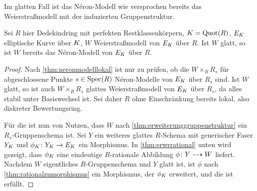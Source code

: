 Im glatten Fall ist das Néron-Modell wie versprochen bereits das
Weierstraßmodell mit der induzierten Gruppenstruktur.
\begin{Satz}\label{thm:neronmausweierstrassgl}
  Sei $R$ hier Dedekindring mit perfekten Restklassenkörpern,
  ${K=\operatorname{Quot}(R)}$,
  $E_{K}$ elliptische Kurve über $K$, $W$ Weierstraßmodell von $E_{K}$
  über $R$.
  Ist $W$ glatt, so ist $W$ bereits das Néron-Modell von $E_{K}$ über
  $R$.
  \begin{proof}
    Nach \ref{thm:neronmodelllokal} ist nur zu prüfen, ob die 
    $W\times_R R_s$ für abgeschlossene Punkte $s\in\operatorname{Spec}(R)$
    Néron-Modelle von $E_{K}$ über $R_s$ sind.
    Ist $W$ glatt, so ist auch $W\times_R R_s$ glattes
    Weierstraßmodell von $E_{K}$ über $R_s$, da alles stabil unter
    Basiswechsel ist.
    Sei daher $R$ ohne Einschränkung bereits lokal, also diskreter
    Bewertungsring.
    

    Für die \NAbbEig ist nun von Nutzen, dass $W$ nach
    \ref{thm:erweiterunggruppenstruktur} ein $R_s$-Gruppenschema ist.
    Sei $Y$ ein weiteres glattes $R$-Schema mit generischer Faser
    $Y_{K}$ und ${\phi_{K}\colon Y_{K}\to E_{K}}$ ein Morphismus.
    In \ref{thm:erwrrational} unten wird gezeigt, dass $\phi_{K}$ eine
    eindeutige $R$-rationale Abbildung ${\phi\colon Y\dashrightarrow W}$ liefert.
    Nachdem $W$ eigentliches $R$-Gruppenschema und $Y$ glatt ist, ist
    $\phi$ nach \ref{thm:rationalzumorphismus} ein Morphismus, der
    $\phi_{K}$ erweitert, und die \NAbbEig ist erfüllt.
  \end{proof}
\end{Satz}


